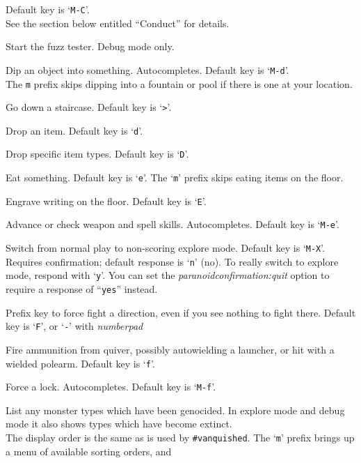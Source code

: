 \documentclass[titlepage]{article}
\begin{document}
\begin{description}[font=\mdseries\ttfamily]
Default key is `\texttt{M-C}'.\\
See the section below entitled ``Conduct'' for details.
\item[\#debugfuzzer]
Start the fuzz tester.
Debug mode only.
\item[\#dip]
Dip an object into something. Autocompletes. Default key is `\texttt{M-d}'.\\
The \texttt{m} prefix skips dipping into a fountain or pool if there
is one at your location.
\item[\#down]
Go down a staircase. Default key is `\texttt{>}'.
\item[\#drop]
Drop an item. Default key is `\texttt{d}'.
\item[\#droptype]
Drop specific item types. Default key is `\texttt{D}'.
\item[\#eat]
Eat something. Default key is `\texttt{e}'.
The `\texttt{m}' prefix skips eating items on the floor.
\item[\#engrave]
Engrave writing on the floor. Default key is `\texttt{E}'.
\item[\#enhance]
Advance or check weapon and spell skills. Autocompletes.
Default key is `\texttt{M-e}'.
\item[\#exploremode]
Switch from normal play to non-scoring explore mode.
Default key is `\texttt{M-X}'.\\
Requires confirmation; default response is `\texttt{n}' (no).
To really switch to explore mode, respond with `\texttt{y}'.
You can set the
\textit{paranoid\textunderscore confirmation:quit}
option to require a response of ``\texttt{yes}'' instead.
\item[\#fight]
Prefix key to force fight a direction, even if you see nothing
to fight there.
Default key is `\texttt{F}', or `\texttt{-}' with
\textit{number\textunderscore pad}
\item[\#fire]
Fire ammunition from quiver, possibly autowielding a launcher,
or hit with a wielded polearm.
Default key is `\texttt{f}'.
\item[\#force]
Force a lock. Autocompletes. Default key is `\texttt{M-f}'.
\item[\#genocided]
List any monster types which have been genocided.
In explore mode and debug mode it also shows types which have become
extinct.
\\
The display order is the same as is used by \texttt{\#vanquished}.
The `\texttt{m}' prefix brings up a menu of available sorting orders, and

\end{description}
\end{document}
